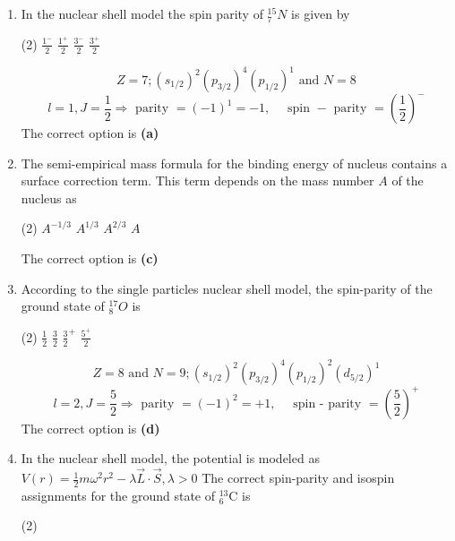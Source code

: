 \begin{enumerate}
\item In the nuclear shell model the spin parity of ${ }_{7}^{15} N$ is given by
{}
\begin{tasks}(2)
	\task[\textbf{A.}] $\frac{1^{-}}{2}$
	\task[\textbf{B.}]$\frac{1^{+}}{2}$
	\task[\textbf{C.}]$\frac{3^{-}}{2}$
	\task[\textbf{D.}]$\frac{3^{+}}{2}$
\end{tasks}
\begin{answer}
	$$
	Z=7 ;\left(s_{1 / 2}\right)^{2}\left(p_{3 / 2}\right)^{4}\left(p_{1 / 2}\right)^{1} \text { and } N=8
	$$
	$$
	l=1, J=\frac{1}{2} \Rightarrow \text { parity }=(-1)^{1}=-1, \quad \text { spin }-\text { parity }=\left(\frac{1}{2}\right)^{-}
	$$
	The correct option is \textbf{(a)}
\end{answer}
\item The semi-empirical mass formula for the binding energy of nucleus contains a surface correction term. This term depends on the mass number $A$ of the nucleus as
{}
\begin{tasks}(2)
	\task[\textbf{A.}] $A^{-1 / 3}$
	\task[\textbf{B.}]$A^{1 / 3}$
	\task[\textbf{C.}]$A^{2 / 3}$
	\task[\textbf{D.}]$A$
\end{tasks}
\begin{answer}
	The correct option is \textbf{(c)}
\end{answer}
\item According to the single particles nuclear shell model, the spin-parity of the ground state of ${ }_{8}^{17} O$ is
{}
\begin{tasks}(2)
	\task[\textbf{A.}] $\frac{1}{2}$
	\task[\textbf{B.}]$\frac{3}{2}$
	\task[\textbf{C.}]$\frac{3}{2}^{+}$
	\task[\textbf{D.}] $\frac{5^{+}}{2}$
\end{tasks}
\begin{answer}
	$$Z=8 \text { and } N=9 ;\left(s_{1 / 2}\right)^{2}\left(p_{3 / 2}\right)^{4}\left(p_{1 / 2}\right)^{2}\left(d_{5 / 2}\right)^{1}$$
	$$
	l=2, J=\frac{5}{2} \Rightarrow \text { parity }=(-1)^{2}=+1, \quad \text { spin - parity }=\left(\frac{5}{2}\right)^{+}
	$$
	The correct option is \textbf{(d)}
\end{answer}
\item In the nuclear shell model, the potential is modeled as $V(r)=\frac{1}{2} m \omega^{2} r^{2}-\lambda \vec{L} \cdot \vec{S}, \lambda>0$ The correct spin-parity and isospin assignments for the ground state of ${ }_{6}^{13} \mathrm{C}$ is
{}
\begin{tasks}(2)

\end{tasks}
\end{enumerate}

